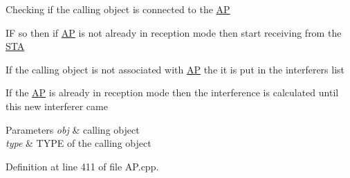 \begin{DoxyEnumerate}
\item Checking if the calling object is connected to the \hyperlink{classAP}{A\-P} \par

\item I\-F so then if \hyperlink{classAP}{A\-P} is not already in reception mode then start receiving from the \hyperlink{classSTA}{S\-T\-A} \par

\item If the calling object is not associated with \hyperlink{classAP}{A\-P} the it is put in the interferers list \par

\item If the \hyperlink{classAP}{A\-P} is already in reception mode then the interference is calculated until this new interferer came \par
 
\begin{DoxyParams}{Parameters}
{\em obj} & calling object \\
\hline
{\em type} & T\-Y\-P\-E of the calling object \\
\hline
\end{DoxyParams}

\end{DoxyEnumerate}

Definition at line 411 of file A\-P.\-cpp.


